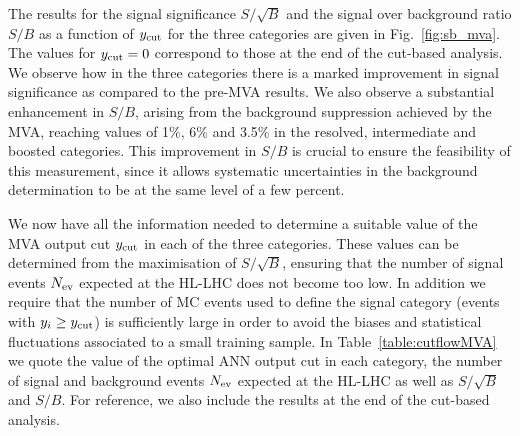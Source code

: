 The results for the signal significance $S/\sqrt{B}$ and
the signal over background ratio
$S/B$ as a function of $y_{\rm cut}$
for the three categories are given in 
Fig.~\ref{fig:sb_mva}.
%
The values 
for $y_{\rm cut}=0$ correspond to those at
the end of the cut-based analysis.
%
We observe how in the three
 categories there is a marked  improvement in signal
significance as compared to the pre-MVA results.
%
We also observe a substantial enhancement in $S/B$, arising
from the background suppression achieved by the MVA, reaching
values of 1\%, 6\% and 3.5\% in the resolved,
intermediate and boosted categories.
%
This improvement in $S/B$ is crucial to ensure the feasibility
of this measurement, since it allows systematic
uncertainties in the background determination to
be at the same level of a few percent.

We now have all the
information needed to determine a suitable
value of the MVA output cut $y_{\rm cut}$ in each
of the three categories.
%
These values can be determined from the maximisation of $S/\sqrt{B}$,
ensuring that the number of signal events $N_{\rm ev}$
expected at the HL-LHC does not become too low.
%
In  addition we require
that the number of MC events used to define the signal
category (events with $y_i \ge y_{\rm cut}$)
is sufficiently large in order to avoid the biases and statistical
fluctuations associated to a small training sample.
%
In Table~\ref{table:cutflowMVA} we quote
the value of the optimal ANN output
cut in each category,
the number of signal and background events $N_{\rm ev}$ expected
at the HL-LHC as well as $S/\sqrt{B}$ and $S/B$.
%
For reference, we also include the results at the end of
the cut-based
analysis.
%

